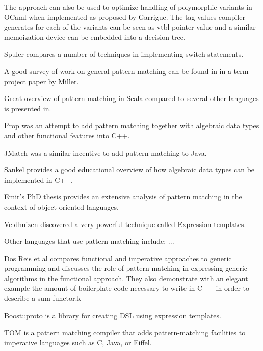 \documentclass[preprint]{sigplanconf}
\begin{document}
The approach can also be used to optimize handling of polymorphic variants in 
OCaml when implemented as proposed by Garrigue\cite{garrigue-98}. The tag values 
compiler generates for each of the variants can be seen as vtbl pointer value 
and a similar memoization device can be embedded into a decision tree.

Spuler compares a number of techniques in implementing switch 
statements\cite{Spuler94}.

A good survey of work on general pattern matching can be found in in a term 
project paper by Miller\cite{Miller10}.

Great overview of pattern matching in Scala compared to several other languages 
is presented in\cite{ScalaPM}.

Prop was an attempt to add pattern matching together with algebraic data types 
and other functional features into C++\cite{Prop96}.

JMatch was a similar incentive to add pattern matching to Java.

Sankel provides a good educational overview of how algebraic data types can be 
implemented in C++\cite{SankelFP10,Sankel10}. 

Emir's PhD thesis provides an extensive analysis of pattern matching in the 
context of object-oriented languages\cite{EmirThesis}.

Veldhuizen discovered a very powerful technique called Expression 
templates\cite{Veldhuizen95expressiontemplates}.

Other languages that use pattern matching include: ...

Dos Reis et al compares functional and imperative approaches to generic 
programming and discusses the role of pattern matching in expressing generic 
algorithms in the functional approach\cite{dos_reis:05:what_is_gp}. They also 
demonstrate with an elegant example the amount of boilerplate code necessary to 
write in C++ in order to describe a sum-functor.k

Boost::proto is a library for creating DSL using expression templates.

TOM is a pattern matching compiler that adds pattern-matching facilities to 
imperative languages such as C, Java, or Eiffel.\cite{Moreau:2003}
\end{document}
